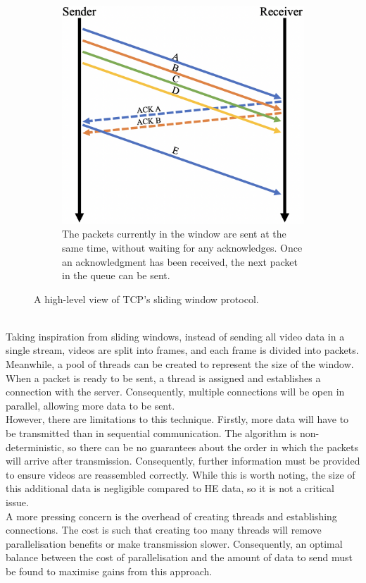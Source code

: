 \begin{figure}[htp]
\begin{subfigure}[b]{0.45\textwidth}
        \includegraphics[scale=0.35]{figures/slidingWindow2}
        \caption{The packets currently in the window are sent at the same time, without waiting for any acknowledges. Once an acknowledgment has been received, the next packet in the queue can be sent.}
    \end{subfigure}%
    \caption[The Sliding Window Protocol]{A high-level view of TCP's sliding window protocol.}
    \label{fig:slidingWindow}
\end{figure}
\smallskip \\ \indent
Taking inspiration from sliding windows, instead of sending all video data in a single stream, videos are split into frames, and each frame is divided into packets. Meanwhile, a pool of threads can be created to represent the size of the window. When a packet is ready to be sent, a thread is assigned and establishes a connection with the server. Consequently, multiple connections will be open in parallel, allowing more data to be sent. 
\smallskip \\ \indent
However, there are limitations to this technique. Firstly, more data will have to be transmitted than in sequential communication. The algorithm is non-deterministic, so there can be no guarantees about the order in which the packets will arrive after transmission. Consequently, further information must be provided to ensure videos are reassembled correctly. While this is worth noting, the size of this additional data is negligible compared to HE data, so it is not a critical issue. 
\smallskip \\ \indent
A more pressing concern is the overhead of creating threads and establishing connections. The cost is such that creating too many threads will remove parallelisation benefits or make transmission slower. Consequently, an optimal balance between the cost of parallelisation and the amount of data to send must be found to maximise gains from this approach.

